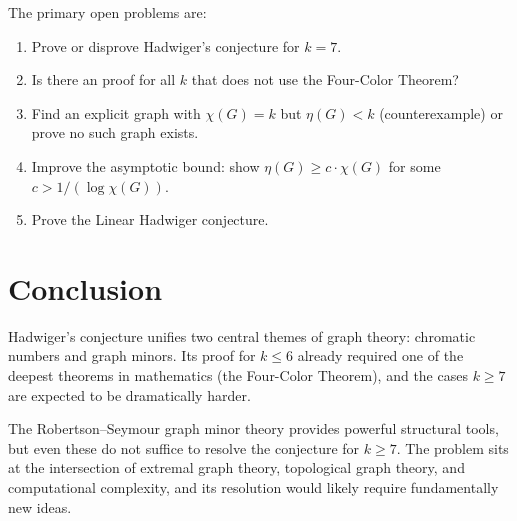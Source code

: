 \documentclass[12pt,a4paper]{amsart}
\theoremstyle{definition}
\theoremstyle{remark}
\begin{document}
\medskip

The primary open problems are:
\begin{enumerate}[label=(\arabic*)]
  \item Prove or disprove Hadwiger's conjecture for $k = 7$.
  \item Is there an proof for all $k$ that does not use the Four-Color Theorem?
  \item Find an explicit graph with $\chi(G) = k$ but $\eta(G) < k$ (counterexample)
        or prove no such graph exists.
  \item Improve the asymptotic bound: show $\eta(G) \geq c \cdot \chi(G)$ for
        some $c > 1/(\log \chi(G))$.
  \item Prove the Linear Hadwiger conjecture.
\end{enumerate}

\section{Conclusion}

Hadwiger's conjecture unifies two central themes of graph theory: chromatic numbers
and graph minors. Its proof for $k \leq 6$ already required one of the deepest
theorems in mathematics (the Four-Color Theorem), and the cases $k \geq 7$ are
expected to be dramatically harder.

The Robertson--Seymour graph minor theory provides powerful structural tools,
but even these do not suffice to resolve the conjecture for $k \geq 7$. The
problem sits at the intersection of extremal graph theory, topological graph
theory, and computational complexity, and its resolution would likely require
fundamentally new ideas.
\end{document}
